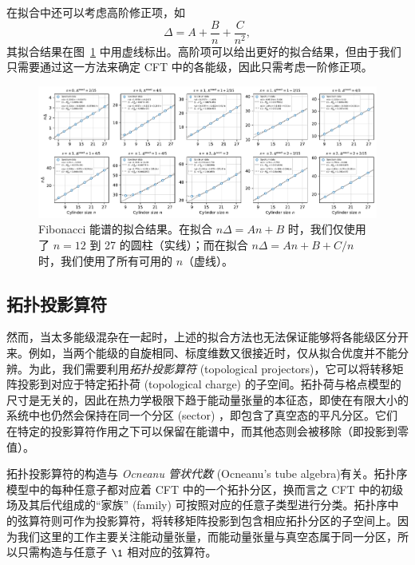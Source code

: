 在拟合中还可以考虑高阶修正项，如
\begin{equation}
  \Delta = A + \frac{B}{n} + \frac{C}{n^2},
\end{equation}
其拟合结果在图~\ref{fig:fib-fitting} 中用虚线标出。高阶项可以给出更好的拟合结果，但由于我们只需要通过这一方法来确定 CFT 中的各能级，因此只需考虑一阶修正项。

\begin{figure}[ht]
  \centering
  \includegraphics[width=\textwidth]{images/fibonacci/fib-fitting.pdf}
  \caption[Fibonacci 能谱的拟合结果]{Fibonacci 能谱的拟合结果。在拟合 $n\Delta=An+B$ 时，我们仅使用了 $n=12$ 到 27 的圆柱（实线）；而在拟合 $n\Delta=An+B+C/n$ 时，我们使用了所有可用的 $n$（虚线）。}
  \label{fig:fib-fitting}
\end{figure}

\subsection{拓扑投影算符}
\label{subsec:topological-projectors}

然而，当太多能级混杂在一起时，上述的拟合方法也无法保证能够将各能级区分开来。例如，当两个能级的自旋相同、标度维数又很接近时，仅从拟合优度并不能分辨。为此，我们需要利用\emph{拓扑投影算符} (topological projectors)\cite{bultinck2017anyons,williamson2017symmetry,aasen2020topological}，它可以将转移矩阵投影到对应于特定拓扑荷 (topological charge) 的子空间。拓扑荷与格点模型的尺寸是无关的，因此在热力学极限下趋于能动量张量的本征态，即使在有限大小的系统中也仍然会保持在同一个分区 (sector) ，即包含了真空态的平凡分区。它们在特定的投影算符作用之下可以保留在能谱中，而其他态则会被移除（即投影到零值）。

拓扑投影算符的构造与 \emph{Ocneanu 管状代数} (Ocneanu's tube algebra)\cite{evans1995ocneanu,evans1998quantum}有关。拓扑序模型中的每种任意子都对应着 CFT 中的一个拓扑分区，换而言之 CFT 中的初级场及其后代组成的“家族” (family) 可按照对应的任意子类型进行分类。拓扑序中的弦算符则可作为投影算符，将转移矩阵投影到包含相应拓扑分区的子空间上。因为我们这里的工作主要关注能动量张量，而能动量张量与真空态属于同一分区，所以只需构造与任意子 $\1$ 相对应的弦算符。

